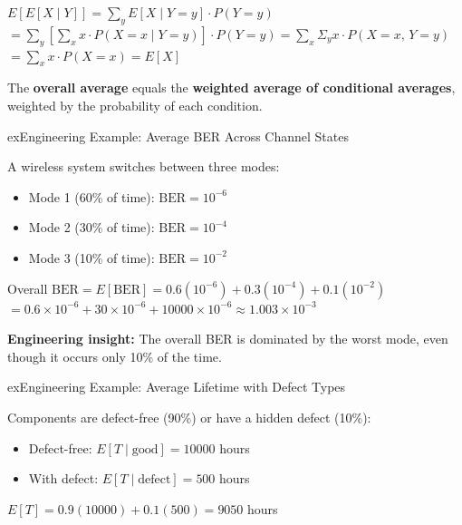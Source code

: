 
$E[E[X \mid Y]] = \sum_{y} E[X \mid Y = y] \cdot P(Y = y)$\PSbr{}$= \sum_{y} \left[\sum_{x} x \cdot P(X = x \mid Y = y)\right] \cdot P(Y = y)$\PSbr{}$= \sum_{x} \Sigma_{y} x \cdot P(X = x,\, Y = y)$\PSbr{}$= \sum_{x} x \cdot P(X = x) = E[X]$ \PSyes{}


The \textbf{overall average} equals the \textbf{weighted average of conditional averages}, weighted by the probability of each condition.

\begin{PSbox}[unbreakable]{ex}{Engineering Example: Average BER Across Channel States}

A wireless system switches between three modes:

\begin{itemize}
\tightlist
\item
  Mode 1 (60\% of time): $\mathrm{BER} = 10^{-6}$
\item
  Mode 2 (30\% of time): $\mathrm{BER} = 10^{-4}$
\item
  Mode 3 (10\% of time): $\mathrm{BER} = 10^{-2}$
\end{itemize}

Overall $\mathrm{BER} = E[\mathrm{BER}] = 0.6(10^{-6}) + 0.3(10^{-4}) + 0.1(10^{-2})$\PSbr{}$= 0.6 \times 10^{-6} + 30 \times 10^{-6} + 10000 \times 10^{-6} \approx 1.003 \times 10^{-3}$

\textbf{Engineering insight:} The overall BER is dominated by the worst mode, even though it occurs only 10\% of the time.

\end{PSbox}

\begin{PSbox}[unbreakable]{ex}{Engineering Example: Average Lifetime with Defect Types}

Components are defect-free (90\%) or have a hidden defect (10\%):

\begin{itemize}
\tightlist
\item
  Defect-free: $E[T \mid \text{good}] = 10000$ hours
\item
  With defect: $E[T \mid \text{defect}] = 500$ hours
\end{itemize}

$E[T] = 0.9(10000) + 0.1(500) = 9050$ hours

\end{PSbox}

